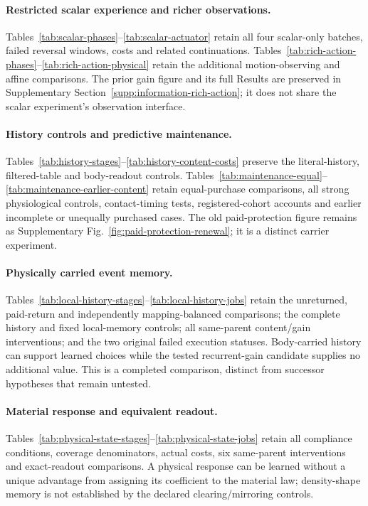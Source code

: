 \paragraph{Restricted scalar experience and richer observations.} Tables~\ref{tab:scalar-phases}--\ref{tab:scalar-actuator} retain all four scalar-only batches, failed reversal windows, costs and related continuations. Tables~\ref{tab:rich-action-phases}--\ref{tab:rich-action-physical} retain the additional motion-observing and affine comparisons. The prior gain figure and its full Results are preserved in Supplementary Section~\ref{supp:information-rich-action}; it does not share the scalar experiment's observation interface.

\paragraph{History controls and predictive maintenance.} Tables~\ref{tab:history-stages}--\ref{tab:history-content-costs} preserve the literal-history, filtered-table and body-readout controls. Tables~\ref{tab:maintenance-equal}--\ref{tab:maintenance-earlier-content} retain equal-purchase comparisons, all strong physiological controls, contact-timing tests, registered-cohort accounts and earlier incomplete or unequally purchased cases. The old paid-protection figure remains as Supplementary Fig.~\ref{fig:paid-protection-renewal}; it is a distinct carrier experiment.

\paragraph{Physically carried event memory.} Tables~\ref{tab:local-history-stages}--\ref{tab:local-history-jobs} retain the unreturned, paid-return and independently mapping-balanced comparisons; the complete history and fixed local-memory controls; all same-parent content/gain interventions; and the two original failed execution statuses. Body-carried history can support learned choices while the tested recurrent-gain candidate supplies no additional value. This is a completed comparison, distinct from successor hypotheses that remain untested.

\paragraph{Material response and equivalent readout.} Tables~\ref{tab:physical-state-stages}--\ref{tab:physical-state-jobs} retain all compliance conditions, coverage denominators, actual costs, six same-parent interventions and exact-readout comparisons. A physical response can be learned without a unique advantage from assigning its coefficient to the material law; density-shape memory is not established by the declared clearing/mirroring controls.
